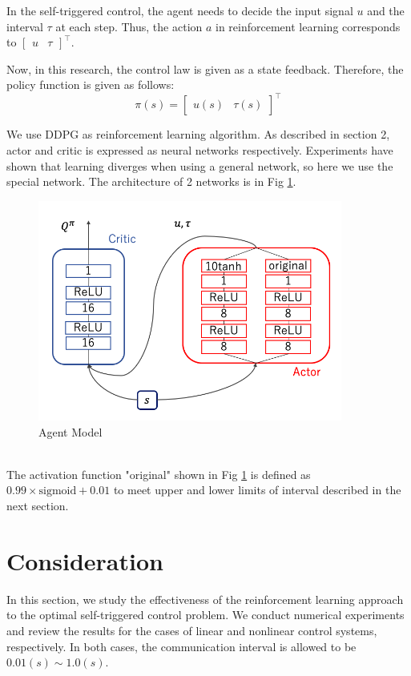 \documentclass[english, dvipdfmx]{ampmt}             %
\begin{document}
In the self-triggered control, the agent needs to decide the input signal $u$ and the interval $\tau$ at each step. Thus, the action $a$ in reinforcement learning corresponds to $\begin{bmatrix}u & \tau \end{bmatrix}^{\top}$. \par
Now, in this research, the control law is given as a state feedback. Therefore, the policy function is given as follows:
\begin{equation}
	\pi(s) = \begin{bmatrix}u(s) & \tau(s)\end{bmatrix}^{\top}
\end{equation}\par
We use DDPG as reinforcement learning algorithm. As described in section 2, actor and critic is expressed as neural networks respectively. Experiments have shown that learning diverges when using a general network, so here we use the special network. The architecture of 2 networks is in Fig \ref{NN}.
\begin{figure}[h]
	\centering
 	\includegraphics[width=10cm]{model.png}
 	\caption{Agent Model} \label{NN}
\end{figure}\\
The activation function "original" shown in Fig \ref{NN} is defined as $0.99 \times \textrm{sigmoid} + 0.01$ to meet upper and lower limits of interval described in the next section.\par


\section{Consideration}
In this section, we study the effectiveness of the reinforcement learning approach to the optimal self-triggered control problem. We conduct numerical experiments and review the results for the cases of linear and nonlinear control systems, respectively. In both cases, the communication interval is allowed to be $0.01 (s) \sim 1.0 (s)$. 
\end{document}

